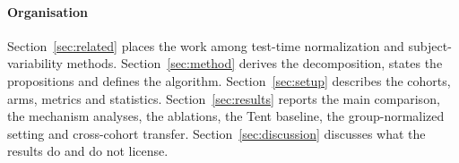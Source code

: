 \paragraph{Organisation}
Section~\ref{sec:related} places the work among test-time normalization and
subject-variability methods. Section~\ref{sec:method} derives the
decomposition, states the propositions and defines the algorithm.
Section~\ref{sec:setup} describes the cohorts, arms, metrics and statistics.
Section~\ref{sec:results} reports the main comparison, the mechanism analyses,
the ablations, the Tent baseline, the group-normalized setting and
cross-cohort transfer. Section~\ref{sec:discussion} discusses what the results
do and do not license.
